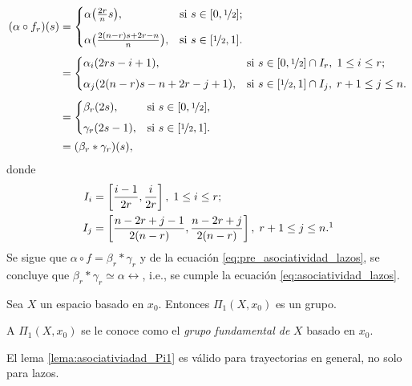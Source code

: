 \begin{dem}
    \begin{align*}
        (\alpha\circ f_r)(s)&=\begin{cases} 
            \alpha\big(\frac{2r}{n}s\big), & \text{si } s\in [0,\nicefrac{1}{2}]; \\[2ex]
            \alpha\big(\frac{2(n-r)s + 2r - n}{n}\big), & \text{si } s \in [\nicefrac{1}{2},1].
        \end{cases}\\[0.5ex]
        &=\begin{cases} 
            \alpha_i(2rs-i+1), & \text{si } s\in [0,\nicefrac{1}{2}]\cap I_r,\; 1\leq i\leq r; \\[1ex]
            \alpha_j (2(n-r)s - n + 2r - j + 1), & \text{si } s \in [\nicefrac{1}{2},1]\cap I_j,
            \; r+1\leq j\leq n.
        \end{cases}\\[0.5ex]
        &=\begin{cases} 
            \beta_r(2s), & \text{si } s\in [0,\nicefrac{1}{2}], \\[1ex]
            \gamma_r(2s-1), & \text{si } s \in [\nicefrac{1}{2},1].
        \end{cases}\\
         &=(\beta_r*\gamma_r)(s),
    \end{align*}
    donde
    \begin{align*}
        I_i&=\left[ \frac{i-1}{2r}, \frac{i}{2r} \right],\; 1\leq i\leq r;\\
        I_j&=\left[ \frac{n-2r+j-1}{2(n-r)}, \frac{n-2r+j}{2(n-r)} \right],\;  r+1\leq j\leq n.\footnotemark
    \end{align*}
    Se sigue que $\alpha\circ f=\beta_r*\gamma_r$ y de la ecuación \ref{eq:pre_asociatividad_lazos}, se concluye que $\beta_r*\gamma_r\simeq \alpha\rel$, i.e., se cumple la ecuación \ref{eq:asociatividad_lazos}.
    \end{dem}
    \begin{coro}
        Sea $X$ un espacio basado en $x_0$. Entonces $\Pi_1(X,x_0)$ es un grupo.
    \end{coro}
    \begin{obs}
         A $\Pi_1(X,x_0)$ se le conoce como el \textit{grupo fundamental de} $X$ basado en $x_0.$
    \end{obs}
    \begin{nota}
        El lema \ref{lema:asociativiadad_Pi1} es válido para trayectorias en general, no solo para lazos.
    \end{nota}
